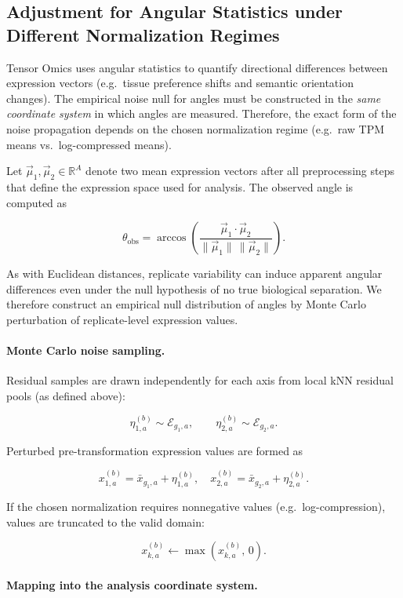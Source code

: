 \subsection{Adjustment for Angular Statistics under Different Normalization Regimes}

Tensor Omics uses angular statistics to quantify directional differences between expression vectors (e.g.\ tissue preference shifts and semantic orientation changes). The empirical noise null for angles must be constructed in the \emph{same coordinate system} in which angles are measured. Therefore, the exact form of the noise propagation depends on the chosen normalization regime (e.g.\ raw TPM means vs.\ log-compressed means).

Let $\vec{\mu}_1, \vec{\mu}_2 \in \mathbb{R}^A$ denote two mean expression vectors after all preprocessing steps that define the expression space used for analysis. The observed angle is computed as

\[
\theta_{\mathrm{obs}} =
\arccos
\left(
\frac{
\vec{\mu}_1 \cdot \vec{\mu}_2
}{
\|\vec{\mu}_1\| \, \|\vec{\mu}_2\|
}
\right).
\]

As with Euclidean distances, replicate variability can induce apparent angular differences even under the null hypothesis of no true biological separation. We therefore construct an empirical null distribution of angles by Monte Carlo perturbation of replicate-level expression values.

\paragraph{Monte Carlo noise sampling.}

Residual samples are drawn independently for each axis from local kNN residual pools (as defined above):

\[
\eta_{1,a}^{(b)} \sim \mathcal{E}_{g_1,a},
\qquad
\eta_{2,a}^{(b)} \sim \mathcal{E}_{g_2,a}.
\]

Perturbed pre-transformation expression values are formed as

\[
x_{1,a}^{(b)} = \bar{x}_{g_1,a} + \eta_{1,a}^{(b)}, \quad
x_{2,a}^{(b)} = \bar{x}_{g_2,a} + \eta_{2,a}^{(b)}.
\]

If the chosen normalization requires nonnegative values (e.g.\ log-compression), values are truncated to the valid domain:

\[
x_{k,a}^{(b)} \leftarrow \max(x_{k,a}^{(b)},\,0).
\]

\paragraph{Mapping into the analysis coordinate system.}

